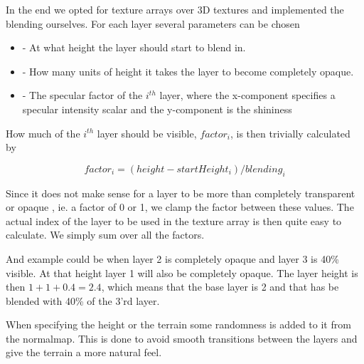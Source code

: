 In the end we opted for texture arrays over 3D textures and
implemented the blending ourselves. For each layer several parameters
can be chosen

\newcommand{\layerProp}[2]{\item \code{#1} - #2}
\begin{itemize}
  \layerProp{startHeight}{At what height the layer should start to
    blend in.}
  \layerProp{blending}{How many units of height it takes the layer to
    become completely opaque.}
  \layerProp{spec[i]}{The specular factor of the $i^{th}$ layer, where the
    x-component specifies a specular intensity scalar and the
    y-component is the shininess}
\end{itemize}

How much of the $i^{th}$ layer should be visible, $factor_i$, is then
trivially calculated by

\begin{displaymath}
  factor_i = (height - startHeight_i) / blending_i
\end{displaymath}

Since it does not make sense for a layer to be more than completely
transparent or opaque , ie. a factor of 0 or 1, we clamp the factor
between these values. The actual index of the layer to be used in the
texture array is then quite easy to calculate. We simply sum over all
the factors.

And example could be when layer 2 is completely opaque and layer 3 is
40\% visible. At that height layer 1 will also be completely
opaque. The layer height is then $1 + 1 + 0.4 = 2.4$, which means that
the base layer is 2 and that has be blended with 40\% of the 3'rd
layer.

When specifying the height or the terrain some randomness is added to
it from the normalmap. This is done to avoid smooth transitions
between the layers and give the terrain a more natural feel.



